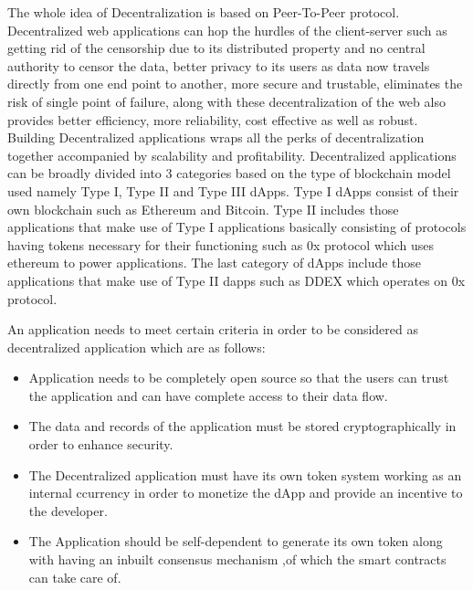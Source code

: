 \documentclass[12pt]{article}
\begin{document}
The whole idea of Decentralization is based on Peer-To-Peer protocol. Decentralized web applications can hop the hurdles of the client-server such as getting rid of the censorship due to its distributed property and no central authority to censor the data, better privacy to its users as data now travels directly from one end point to another, more secure and trustable, eliminates the risk of single point of failure, along with these decentralization of the web also provides better efficiency,  more reliability, cost effective as well as robust. Building Decentralized applications wraps all the perks of decentralization together accompanied by scalability and profitability. Decentralized applications can be broadly divided into 3 categories based on the type of blockchain model used namely Type I, Type II and Type III dApps. Type I dApps consist of their own blockchain such as Ethereum and Bitcoin. Type II includes those applications that make use of Type I applications basically consisting of protocols having tokens necessary for their functioning such as 0x protocol which uses ethereum to power applications. The last category of dApps include those applications that make use of  Type II dapps such as DDEX which operates on 0x protocol.  

\bigskip

An application needs to meet certain criteria in order to be considered as decentralized application which are as follows:
\begin{itemize}


    \item Application needs to be completely open source so that the users can trust the application and can have complete access to their data flow.
    \item The data and records of the application must be stored cryptographically in order to enhance security.  
    \item The Decentralized application must have its own token system working as an internal ccurrency in order to monetize the dApp and provide an incentive to the developer.
    \item The Application should be self-dependent to generate its own token along with having an inbuilt consensus mechanism ,of which the smart contracts can take care of. 
\end{itemize}
\end{document}
